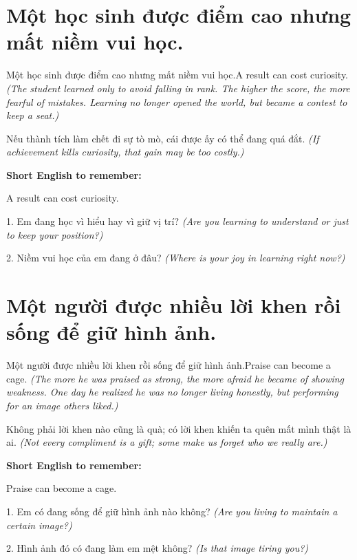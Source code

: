 \section{Một học sinh được điểm cao nhưng mất niềm vui học.}
\begin{truyen}{Một học sinh được điểm cao nhưng mất niềm vui học.}{A result can cost curiosity.}
\textit{(The student learned only to avoid falling in rank. The higher the score, the more fearful of mistakes. Learning no longer opened the world, but became a contest to keep a seat.)}
\end{truyen}
\begin{baihoc}
Nếu thành tích làm chết đi sự tò mò, cái được ấy có thể đang quá đắt.
\textit{(If achievement kills curiosity, that gain may be too costly.)}
\end{baihoc}
\begin{ghinhoanh}\textbf{Short English to remember:}

A result can cost curiosity.
\end{ghinhoanh}
\begin{tuhocnhanh}
1. Em đang học vì hiểu hay vì giữ vị trí? \textit{(Are you learning to understand or just to keep your position?)}

2. Niềm vui học của em đang ở đâu? \textit{(Where is your joy in learning right now?)}
\end{tuhocnhanh}
\ngancach

\section{Một người được nhiều lời khen rồi sống để giữ hình ảnh.}
\begin{truyen}{Một người được nhiều lời khen rồi sống để giữ hình ảnh.}{Praise can become a cage.}
\textit{(The more he was praised as strong, the more afraid he became of showing weakness. One day he realized he was no longer living honestly, but performing for an image others liked.)}
\end{truyen}
\begin{baihoc}
Không phải lời khen nào cũng là quà; có lời khen khiến ta quên mất mình thật là ai.
\textit{(Not every compliment is a gift; some make us forget who we really are.)}
\end{baihoc}
\begin{ghinhoanh}\textbf{Short English to remember:}

Praise can become a cage.
\end{ghinhoanh}
\begin{tuhocnhanh}
1. Em có đang sống để giữ hình ảnh nào không? \textit{(Are you living to maintain a certain image?)}

2. Hình ảnh đó có đang làm em mệt không? \textit{(Is that image tiring you?)}
\end{tuhocnhanh}
\ngancach

